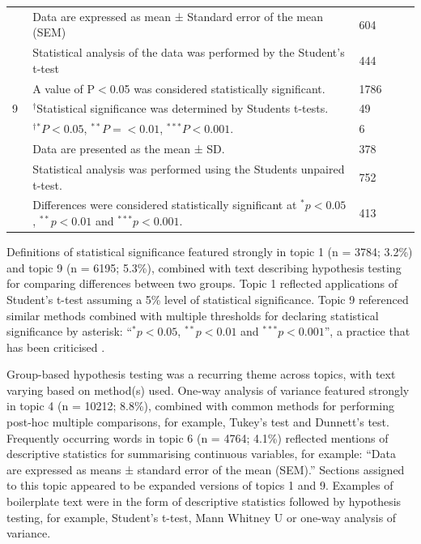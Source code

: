 \documentclass[12pt]{article}
\begin{document}
\begin{landscape}
\begin{table}
{\begin{tabular}[t]{p{0.05\linewidth} p{0.80\linewidth} p{0.15\linewidth}}
\cline{2-3}
 & Data are expressed as mean ± Standard error of the mean (SEM) & 604\\
 & Statistical analysis of the data was performed by the Student’s t-test & 444\\
 & A value of P$<$0.05 was considered statistically significant. & 1786\\
\hline
9 & $^{\dagger}$Statistical significance was determined by Students t-tests. & 49\\
 & $^{\dagger}$$^{*} P<0.05$, $^{**} P = <0.01$, $^{***} P<0.001$. & 6\\
\cline{2-3}
 & Data are presented as the mean ± SD. & 378\\
 & Statistical analysis was performed using the Students unpaired t-test. & 752\\
 & Differences were considered statistically significant at $^{*}p<0.05$, $^{**}p<0.01$ and $^{***}p<0.001$. & 413\\

\hline
\end{tabular}}
\end{table}
\end{landscape}

Definitions of statistical significance featured strongly in topic 1 (n
= 3784; 3.2\%) and topic 9 (n = 6195; 5.3\%), combined with text
describing hypothesis testing for comparing differences between two
groups. Topic 1 reflected applications of Student's t-test assuming a
5\% level of statistical significance. Topic 9 referenced similar
methods combined with multiple thresholds for declaring statistical
significance by asterisk: ``\(^{*}p<0.05\), \(^{**}p<0.01\) and
\(^{***}p<0.001\)'', a practice that has been criticised
\citep{Wasserstein2019}.

Group-based hypothesis testing was a recurring theme across topics, with
text varying based on method(s) used. One-way analysis of
variance featured strongly in topic 4 (n = 10212; 8.8\%), combined
with common methods for performing post-hoc multiple comparisons, for example, Tukey's test and Dunnett's test.
Frequently occurring words in topic 6 (n = 4764; 4.1\%) reflected
mentions of descriptive statistics for summarising continuous variables,
for example: ``Data are expressed as means ± standard error of the mean
(SEM).'' Sections assigned to this topic appeared to be expanded
versions of topics 1 and 9. Examples of boilerplate text were in the
form of descriptive statistics followed by hypothesis testing, for
example, Student's t-test, Mann Whitney U or one-way analysis of
variance.
\end{document}
